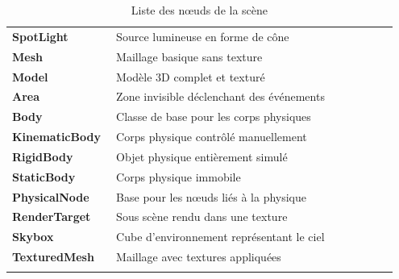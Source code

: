 \begin{longtable}{>{\bfseries}p{0.25\linewidth} p{0.7\linewidth}}
        SpotLight & Source lumineuse en forme de cône \\
        Mesh & Maillage basique sans texture \\
        Model & Modèle 3D complet et texturé \\
        Area & Zone invisible déclenchant des événements \\
        Body & Classe de base pour les corps physiques \\
        KinematicBody & Corps physique contrôlé manuellement \\
        RigidBody & Objet physique entièrement simulé \\
        StaticBody & Corps physique immobile \\
        PhysicalNode & Base pour les nœuds liés à la physique \\
        RenderTarget & Sous scène rendu dans une texture \\
        Skybox & Cube d'environnement représentant le ciel \\
        TexturedMesh & Maillage avec textures appliquées \\
        \bottomrule
        \caption{Liste des n\oe{}uds de la scène}
        \label{tab:raptiquax_nodes}
    \end{longtable}

